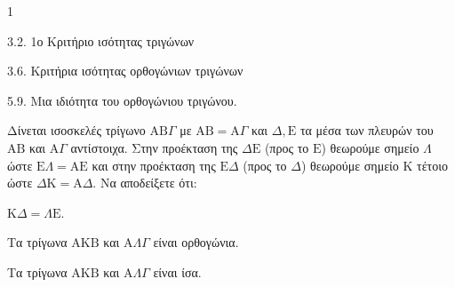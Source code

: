 \begin{ylh}{1}
    \item 3.2. 1ο Κριτήριο ισότητας τριγώνων
    \item 3.6. Κριτήρια ισότητας ορθογώνιων τριγώνων
    \item 5.9. Μια ιδιότητα του ορθογώνιου τριγώνου.
\end{ylh}
Δίνεται ισοσκελές τρίγωνο $\mathrm{A}\mathrm{B}\Gamma$ με $\mathrm{A}\mathrm{B} = \mathrm{A}\Gamma$ και $\Delta, \mathrm{E}$ τα μέσα των πλευρών του $\mathrm{A}\mathrm{B}$ και $\mathrm{A}\Gamma$ αντίστοιχα. Στην προέκταση της $\Delta\mathrm{E}$ (προς το $\mathrm{E}$) θεωρούμε σημείο $\Lambda$ ώστε $\mathrm{E}\Lambda = \mathrm{A}\mathrm{E}$ και στην προέκταση της $\mathrm{E}\Delta$ (προς το $\Delta$) θεωρούμε σημείο $\mathrm{K}$ τέτοιο ώστε $\Delta\mathrm{K} = \mathrm{A}\Delta$.
Να αποδείξετε ότι:
\begin{alist}
    \item $\mathrm{K}\Delta = \Lambda\mathrm{E}$. 
    \item Τα τρίγωνα $\mathrm{A}\mathrm{K}\mathrm{B}$ και $\mathrm{A}\Lambda\Gamma$ είναι ορθογώνια. 
    \item Τα τρίγωνα $\mathrm{A}\mathrm{K}\mathrm{B}$ και $\mathrm{A}\Lambda\Gamma$ είναι ίσα. 
\end{alist}
